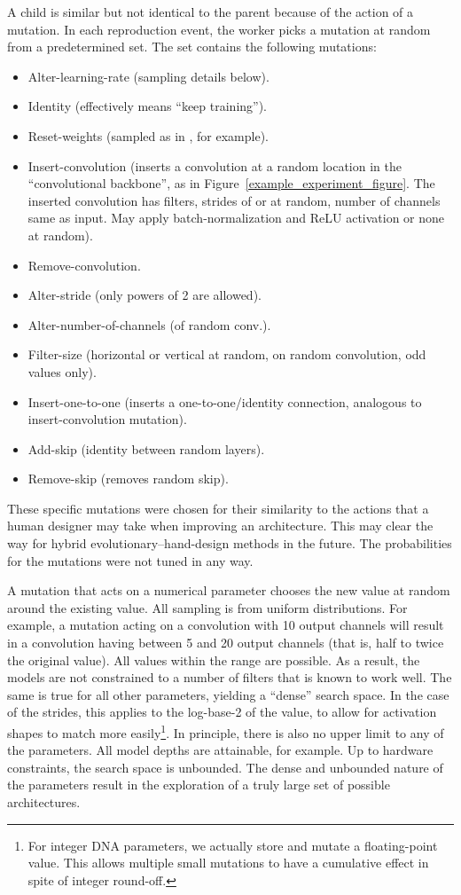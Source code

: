 \documentclass{article}
\begin{document}
A child is similar but not identical to the parent because of the action of a mutation. In each reproduction event, the worker picks a mutation at random from a predetermined set. The set contains the following mutations:
\begin{itemize}[noitemsep,topsep=0pt,leftmargin=*]
    \item {\sc Alter-learning-rate} (sampling details below).
    \item {\sc Identity} (effectively means ``keep training'').
    \item {\sc Reset-weights} (sampled as in \citet{he2015delving}, for example).
    \item {\sc Insert-convolution} (inserts a convolution at a random location in the ``convolutional backbone'', as in Figure~\ref{example_experiment_figure}. The inserted convolution has  filters, strides of  or  at random, number of channels same as input. May apply batch-normalization and ReLU activation or none at random).
    \item {\sc Remove-convolution}.
    \item {\sc Alter-stride} (only powers of 2 are allowed).
    \item {\sc Alter-number-of-channels} (of random conv.).
    \item {\sc Filter-size} (horizontal or vertical at random, on random convolution, odd values only).
    \item {\sc Insert-one-to-one} (inserts a one-to-one/identity connection, analogous to insert-convolution mutation).
    \item {\sc Add-skip} (identity between random layers).
    \item {\sc Remove-skip} (removes random skip).
\end{itemize}
These specific mutations were chosen for their similarity to the actions that a human designer may take when improving an architecture. This may clear the way for hybrid evolutionary--hand-design methods in the future. The probabilities for the mutations were not tuned in any way.

A mutation that acts on a numerical parameter chooses the new value at random around the existing value. All sampling is from uniform distributions. For example, a mutation acting on a convolution with 10 output channels will result in a convolution having between 5 and 20 output channels (that is, half to twice the original value). All values within the range are possible. As a result, the models are not constrained to a number of filters that is known to work well. The same is true for all other parameters, yielding a ``dense'' search space. In the case of the strides, this applies to the log-base-2 of the value, to allow for activation shapes to match more easily\footnote{For integer DNA parameters, we actually store and mutate a floating-point value. This allows multiple small mutations to have a cumulative effect in spite of integer round-off.}. In principle, there is also no upper limit to any of the parameters. All model depths are attainable, for example. Up to hardware constraints, the search space is unbounded. The dense and unbounded nature of the parameters result in the exploration of a truly large set of possible architectures.
\end{document}
